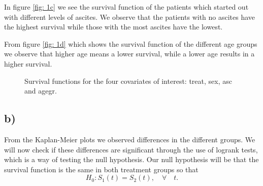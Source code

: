 \documentclass[a4paper, 10pt, reqno]{amsart}
\begin{document}
In figure \ref{fig: 1c} we see the survival function of the patients which started out with different levels of ascites. We observe that the patients with no ascites have the highest survival while those with the most ascites have the lowest.

From figure \ref{fig: 1d} which shows the survival function of the different age groups we observe that higher age means a lower survival, while a lower age results in a higher survival.

\begin{figure}
  \caption{Survival functions for the four covariates of interest: treat, sex, asc and agegr.}
  \label{fig: 1} 
\end{figure}

\subsection{b)}
From the Kaplan-Meier plots we observed differences in the different groups. We will now check if these differences are significant through the use of logrank tests, which is a way of testing the null hypothesis. Our null hypothesis will be that the survival function is the same in both treatment groups so that 
\begin{equation}
    H_0: S_1(t) = S_2(t), \quad  \forall \quad t.
\end{equation}
\end{document}
